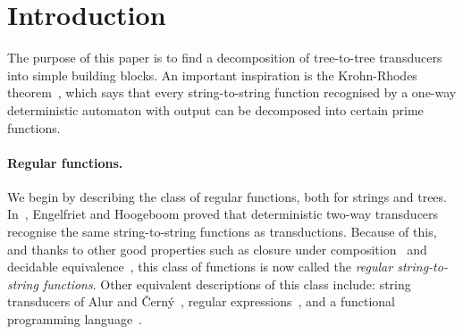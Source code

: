 
\section{Introduction}

The purpose of this paper is to find a decomposition of tree-to-tree transducers into simple building blocks. An important inspiration  is the Krohn-Rhodes theorem~\cite[p.~454]{Krohn1965}, which says that every string-to-string function recognised by a  one-way deterministic automaton with output can be decomposed into certain prime functions. 

\paragraph*{Regular functions.} We begin by describing the class of regular functions, both for strings and trees. In~\cite[Theorem 13]{engelfrietMSODefinableString2001}, Engelfriet and Hoogeboom proved that deterministic two-way transducers recognise the same string-to-string functions as \mso transductions. Because of this, and thanks to other good properties such as closure under composition~\cite[Theorem 1]{chytilSerialComposition2Way1977} and decidable equivalence~\cite[Theorem 1]{gurariEquivalenceProblemDeterministic1982}, this class of functions is now called the \emph{regular string-to-string functions}. Other  equivalent descriptions of this class include: string transducers of Alur and {\v C}ern{\'y}~\cite{alurExpressivenessStreamingString2010}, regular expressions~\cite{alur2014regular,daveGastinKrishna18}, and a functional programming language~\cite{bojanczykRegularFirstOrderList2018}. 
 

